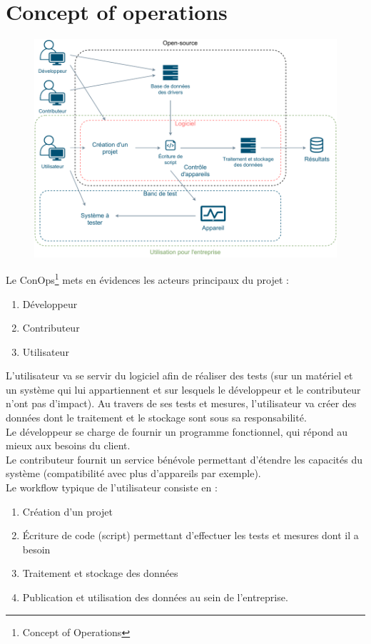 \documentclass[AdvProjMgmt_Sebastien_Deriaz]{subfiles}
\begin{document}
\section{Concept of operations}
\begin{figure}[H]
\centering
\includegraphics[scale=1]{schema_conops.pdf}
\end{figure}
Le ConOps\footnote{Concept of Operations} mets en évidences les acteurs principaux du projet :
\begin{enumerate}
\item Développeur
\item Contributeur
\item Utilisateur
\end{enumerate}
L'utilisateur va se servir du logiciel afin de réaliser des tests (sur un matériel et un système qui lui appartiennent et sur lesquels le développeur et le contributeur n'ont pas d'impact). Au travers de ses tests et mesures, l'utilisateur va créer des données dont le traitement et le stockage sont sous sa responsabilité.\\
Le développeur se charge de fournir un programme fonctionnel, qui répond au mieux aux besoins du client.\\
Le contributeur fournit un service bénévole permettant d'étendre les capacités du système (compatibilité avec plus d'appareils par exemple).\\
Le workflow typique de l'utilisateur consiste en :
\begin{enumerate}
\item Création d'un projet
\item Écriture de code (script) permettant d'effectuer les tests et mesures dont il a besoin
\item Traitement et stockage des données
\item Publication et utilisation des données au sein de l'entreprise.
\end{enumerate}
\end{document}
